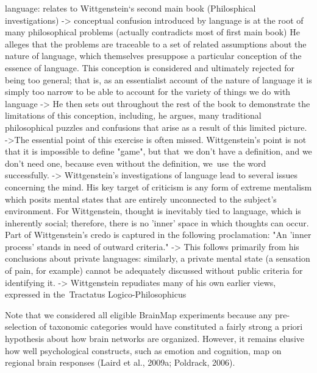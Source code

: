 \documentclass[authoryear,review,3p]{elsarticle}
\begin{document}
language: relates to Wittgenstein‘s second main book (Philosphical investigations)
-> conceptual confusion introduced by language is at the root of many philosophical problems (actually contradicts most of first main book)
He alleges that the problems are traceable to a set of related assumptions about the nature of language, which themselves presuppose a particular conception of the essence of language. This conception is considered and ultimately rejected for being too general; that is, as an essentialist account of the nature of language it is simply too narrow to be able to account for the variety of things we do with language
-> He then sets out throughout the rest of the book to demonstrate the limitations of this conception, including, he argues, many traditional philosophical puzzles and confusions that arise as a result of this limited picture.
->The essential point of this exercise is often missed. Wittgenstein's point is not that it is impossible to define "game", but that we don't have a definition, and we don't need one, because even without the definition, we use the word successfully.
-> Wittgenstein's investigations of language lead to several issues concerning the mind. His key target of criticism is any form of extreme mentalism which posits mental states that are entirely unconnected to the subject's environment. For Wittgenstein, thought is inevitably tied to language, which is inherently social; therefore, there is no 'inner' space in which thoughts can occur. Part of Wittgenstein's credo is captured in the following proclamation: "An 'inner process' stands in need of outward criteria."
-> This follows primarily from his conclusions about private languages: similarly, a private mental state (a sensation of pain, for example) cannot be adequately discussed without public criteria for identifying it.
-> Wittgenstein repudiates many of his own earlier views, expressed in the Tractatus Logico-Philosophicus

Note that we considered all eligible BrainMap experiments because any pre-selection of taxonomic categories would have constituted a fairly strong a priori hypothesis about how brain networks are organized. However, it remains elusive how well psychological constructs, such as emotion and cognition, map on regional brain responses (Laird et al., 2009a; Poldrack, 2006).
\end{document}
